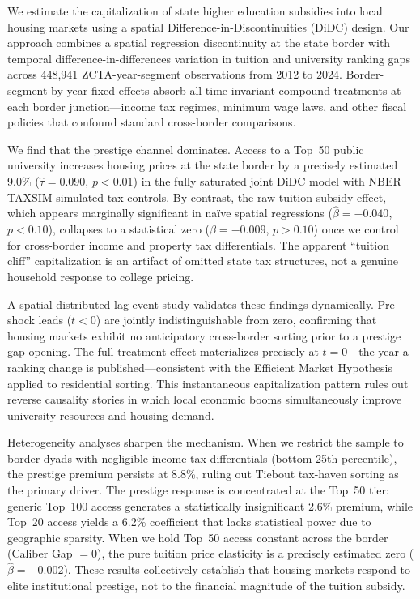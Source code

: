 \documentclass[12pt]{article}
\begin{document}
We estimate the capitalization of state higher education subsidies into local housing markets using a spatial Difference-in-Discontinuities (DiDC) design. Our approach combines a spatial regression discontinuity at the state border with temporal difference-in-differences variation in tuition and university ranking gaps across 448,941 ZCTA-year-segment observations from 2012 to 2024. Border-segment-by-year fixed effects absorb all time-invariant compound treatments at each border junction---income tax regimes, minimum wage laws, and other fiscal policies that confound standard cross-border comparisons.

We find that the prestige channel dominates. Access to a Top~50 public university increases housing prices at the state border by a precisely estimated 9.0\% ($\hat{\tau} = 0.090$, $p < 0.01$) in the fully saturated joint DiDC model with NBER TAXSIM-simulated tax controls. By contrast, the raw tuition subsidy effect, which appears marginally significant in na\"ive spatial regressions ($\hat{\beta} = -0.040$, $p < 0.10$), collapses to a statistical zero ($\hat{\beta} = -0.009$, $p > 0.10$) once we control for cross-border income and property tax differentials. The apparent ``tuition cliff'' capitalization is an artifact of omitted state tax structures, not a genuine household response to college pricing.

A spatial distributed lag event study validates these findings dynamically. Pre-shock leads ($t < 0$) are jointly indistinguishable from zero, confirming that housing markets exhibit no anticipatory cross-border sorting prior to a prestige gap opening. The full treatment effect materializes precisely at $t = 0$---the year a ranking change is published---consistent with the Efficient Market Hypothesis applied to residential sorting. This instantaneous capitalization pattern rules out reverse causality stories in which local economic booms simultaneously improve university resources and housing demand.

Heterogeneity analyses sharpen the mechanism. When we restrict the sample to border dyads with negligible income tax differentials (bottom 25th percentile), the prestige premium persists at 8.8\%, ruling out Tiebout tax-haven sorting as the primary driver. The prestige response is concentrated at the Top~50 tier: generic Top~100 access generates a statistically insignificant 2.6\% premium, while Top~20 access yields a 6.2\% coefficient that lacks statistical power due to geographic sparsity. When we hold Top~50 access constant across the border (Caliber Gap $= 0$), the pure tuition price elasticity is a precisely estimated zero ($\hat{\beta} = -0.002$). These results collectively establish that housing markets respond to elite institutional prestige, not to the financial magnitude of the tuition subsidy.
\end{document}

